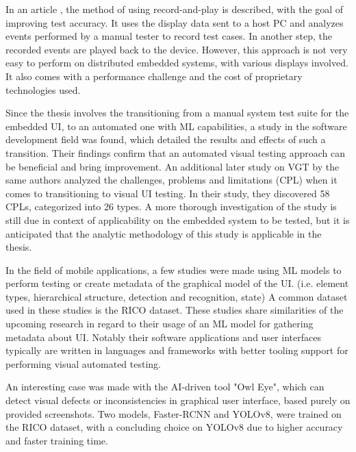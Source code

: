 \documentclass[Proposal,BIC,english,IEEE]{BASE/twbook} %
\begin{document}
In an article \autocite{linImprovingAccuracyAutomated2014}, the method of using record-and-play is described, with the goal of improving test accuracy. It uses the display data sent to a host PC and analyzes events performed by a manual tester to record test cases. In another step, the recorded events are played back to the device. However, this approach is not very easy to perform on distributed embedded systems, with various displays involved. It also comes with a performance challenge and the cost of proprietary technologies used.

Since the thesis involves the transitioning from a manual system test suite for the embedded UI, to an automated one with ML capabilities, a study \autocite{alegrothTransitioningManualSystem2013} in the software development field was found, which detailed the results and effects of such a transition. Their findings confirm that an automated visual testing approach can be beneficial and bring improvement.
An additional later study on VGT by the same authors analyzed the challenges, problems and limitations (CPL) when it comes to transitioning to visual UI testing.\autocite{alegrothVisualGUITesting2015} In their study, they discovered 58 CPLs, categorized into 26 types. A more thorough investigation of the study is still due in context of applicability on the embedded system to be tested, but it is anticipated that the analytic methodology of this study is applicable in the thesis.

In the field of mobile applications, a few studies were made using ML models to perform testing or create metadata of the graphical model of the UI. (i.e. element types, hierarchical structure, detection and recognition, state)
\autocite{altinbasGUIElementDetection2022,chengMobileApplicationGUI2021,liWidgetCaptioningGenerating2020,selcukComparisonYOLOv5YOLOv82023,zhangDeepLearningBasedMobile2020,zhangMachineVisionbasedTesting2022, cavsakGUIComponentDetection} A common dataset used in these studies is the RICO dataset\autocite{dekaRicoMobileApp2017}.
These studies share similarities of the upcoming research in regard to their usage of an ML model for gathering metadata about UI. Notably their software applications and user interfaces typically are written in languages and frameworks with better tooling support for performing visual automated testing.

An interesting case was made with the AI-driven tool "Owl Eye"\autocite{gamalOwlEyeAIDriven2023}, which can detect visual defects or inconsistencies in graphical user interface, based purely on provided screenshots. Two models, Faster-RCNN and YOLOv8, were trained on the RICO dataset, with a concluding choice on YOLOv8 due to higher accuracy and faster training time.
\end{document}

